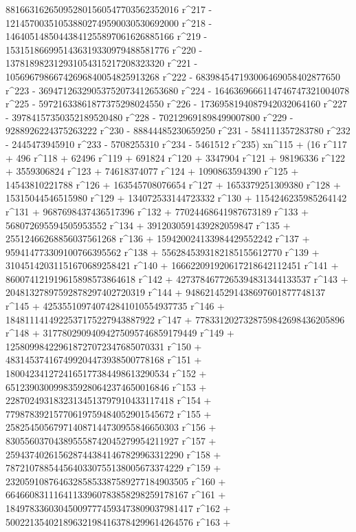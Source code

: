        881663162650952801560547703562352016 r^217 - 
       121457003510538802749590030530692000 r^218 - 
       14640514850443841255897061626885166 r^219 - 
       1531518669951436319330979488581776 r^220 - 
       137818982312931054315217208323320 r^221 - 
       10569679866742696840054825913268 r^222 - 
       683984547193006469058402877650 r^223 - 
       36947126329053752073412653680 r^224 - 
       1646369666114746747321004078 r^225 - 
       59721633861877375298024550 r^226 - 
       1736958194087942032064160 r^227 - 
       39784157350352189520480 r^228 - 702129691898499007800 r^229 - 
       9288926224375263222 r^230 - 88844485230659250 r^231 - 
       584111357283780 r^232 - 2445473945910 r^233 - 
       5708255310 r^234 - 5461512 r^235) xn^115 + (16 r^117 + 
       496 r^118 + 62496 r^119 + 691824 r^120 + 3347904 r^121 + 
       98196336 r^122 + 3559306824 r^123 + 74618374077 r^124 + 
       1090863594390 r^125 + 14543810221788 r^126 + 
       163545708076654 r^127 + 1653379251309380 r^128 + 
       15315044546515980 r^129 + 134072533144723332 r^130 + 
       1154246235985264142 r^131 + 9687698437436517396 r^132 + 
       77024468641987673189 r^133 + 568072695594505953552 r^134 + 
       3912030591439282059847 r^135 + 25512466268856037561268 r^136 + 
       159420024133984429552242 r^137 + 
       959414773309100766395562 r^138 + 
       5562845393182185155612770 r^139 + 
       31045142031151670689258421 r^140 + 
       166622091920617218642112451 r^141 + 
       860074121919615898573864618 r^142 + 
       4273784677265394831344133537 r^143 + 
       20481327897592878297402720319 r^144 + 
       94862145291438697601877748137 r^145 + 
       425355109740742841010554937735 r^146 + 
       1848111414922537175227943887922 r^147 + 
       7783312027328759842698436205896 r^148 + 
       31778029094094275095746859179449 r^149 + 
       125809984229618727072347685070331 r^150 + 
       483145374167499204473938500778168 r^151 + 
       1800423412724165177384498613290534 r^152 + 
       6512390300998359280642374650016846 r^153 + 
       22870249318323134513797910433117418 r^154 + 
       77987839215770619759484052901545672 r^155 + 
       258254505679714087144730955846650303 r^156 + 
       830556037043895558742045279954211927 r^157 + 
       2594374026156287443841467829963312290 r^158 + 
       7872107885445640330755138005673374229 r^159 + 
       23205910876463285853387589277184903505 r^160 + 
       66466083111641133960783858298259178167 r^161 + 
       184978336030450097774593473809037981417 r^162 + 
       500221354021896321984163784299614264576 r^163 + 
